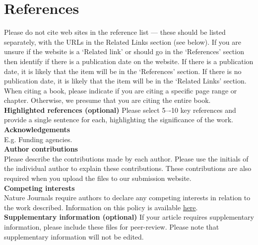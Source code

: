 \documentclass[fleqn,10pt]{wlscirep}
\begin{document}
\section*{References} 





\noindent Please do not cite web sites in the reference list — these should be listed separately, with the URLs in the Related Links section (see below).  If you are unsure if the website is a ‘Related link’ or should go in the ‘References’ section then identify if there is a publication date on the website.  If there is a publication date, it is likely that the item will be in the ‘References’ section.  If there is no publication date, it is likely that the item will be in the ‘Related Links’ section.\\

\noindent When citing a book, please indicate if you are citing a specific page range or chapter.  Otherwise, we presume that you are citing the entire book.  \\

\noindent \textbf{Highlighted references (optional)} Please select 5–-10 key references and provide a single sentence for each, highlighting the significance of the work.\\

\noindent\textbf{Acknowledgements}\\
E.g. Funding agencies.\\

\noindent\textbf{Author contributions}\\
Please describe the contributions made by each author.  Please use the initials of the individual author to explain these contributions.  These contributions are also required when you upload the files to our submission website.\\

\noindent\textbf{Competing interests}\\
Nature Journals require authors to declare any competing interests in relation to the work described. Information on this policy is available \href{http://www.nature.com/authors/policies/competing.html}{here}. \\



\noindent\textbf{Supplementary information (optional)}
If your article requires supplementary information, please include these files for peer-review. Please note that supplementary information will not be edited.
\end{document}
